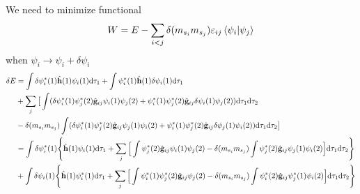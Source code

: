 \documentclass[UTF8]{ctexart} %
\numberwithin{equation}{section}
\begin{document}
We need to minimize functional
\begin{equation}\label{key}
\begin{aligned}
W=E-\sum_{i<j}\delta(m_{s_i}m_{s_j})\varepsilon_{ij}\braket{\psi_i}{\psi_j}
\end{aligned}
\end{equation}
when $\psi_i\rightarrow\psi_i+\delta\psi_i$
\begin{equation}\label{key}
\begin{aligned}
\delta E &=\int\delta\psi_i^*(1)\hat{\vb{h}}(1)\psi_i(1)\dd \tau_1 + \int\psi_i^*(1)\hat{\vb{h}}(1)\delta\psi_i(1)\dd \tau_1\\
&+ \sum_j\big[\int(\delta\psi_i^*(1)\psi_j^*(2)\hat{\vb{g}}_{ij}\psi_i(1)\psi_j(2)+\psi_i^*(1)\psi_j^*(2)\hat{\vb{g}}_{ij}\delta\psi_i(1)\psi_j(2))\dd \tau_1\dd \tau_2\\
&-\delta(m_{s_i}m_{s_j})\int(\delta\psi_i^*(1)\psi_j^*(2)\hat{\vb{g}}_{ij}\psi_j(1)\psi_i(2)+\psi_i^*(1)\psi_j^*(2)\hat{\vb{g}}_{ij}\delta\psi_j(1)\psi_i(2))\dd \tau_1\dd \tau_2\big]\\
&=\int\delta\psi_i^*(1)
\Bigg\{\hat{\vb{h}}(1)\psi_i(1)\dd \tau_1
+\sum_j\Big[\int\psi_j^*(2)\hat{\vb{g}}_{ij}\psi_i(1)\psi_j(2)
-\delta(m_{s_i}m_{s_j})\int\psi_j^*(2)\hat{\vb{g}}_{ij}\psi_j(1)\psi_i(2)\Big]\dd \tau_1\dd \tau_2\Bigg\}\\
&+\int\delta\psi_i(1)
\Bigg\{\hat{\vb{h}}(1)\psi_i^*(1)\dd \tau_1
+\sum_j\Big[\int\psi_i^*(1)\psi_j^*(2)\hat{\vb{g}}_{ij}\psi_j(2)
-\delta(m_{s_i}m_{s_j})\int\psi_i^*(2)\hat{\vb{g}}_{ij}\psi_j^*(1)\psi_i(2)\Big]\dd \tau_1\dd \tau_2\Bigg\}\\
\end{aligned}
\end{equation}



\setcounter{subsection}{1}
\setcounter{subsubsection}{1}
\end{document}
